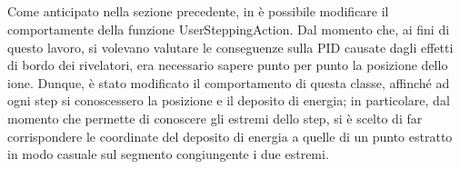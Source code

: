 \subsection{}

Come anticipato nella sezione precedente, in \geant{} è possibile modificare il comportamente della funzione UserSteppingAction.
Dal momento che, ai fini di questo lavoro, si volevano valutare le conseguenze sulla PID causate dagli effetti di bordo dei rivelatori, era necessario sapere punto per punto la posizione dello ione. 
Dunque, è stato modificato il comportamento di questa classe, affinché ad ogni step si conoscessero la posizione e il deposito di energia; in particolare, dal momento che \geant{} permette di conoscere gli estremi dello step, si è scelto di far corrispondere le coordinate del deposito di energia a quelle di un punto estratto in modo casuale sul segmento congiungente i due estremi.








\subsection{}

